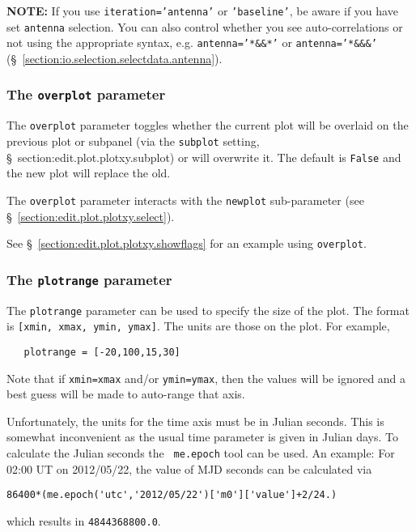 {\bf NOTE:} If you use {\tt iteration='antenna'} or {\tt 'baseline'},
be aware if you have set {\tt antenna} selection.  You can also
control whether you see auto-correlations or not using the appropriate
syntax, e.g. {\tt antenna='*\&\&*'} or {\tt antenna='*\&\&\&'}
(\S~\ref{section:io.selection.selectdata.antenna}).

\subsubsection{ The {\tt overplot} parameter}
\label{section:edit.plot.plotxy.overplot}

The {\tt overplot} parameter toggles whether the current plot will
be overlaid on the previous plot or subpanel (via the {\tt subplot}
setting, \S~{section:edit.plot.plotxy.subplot}) or will overwrite it.
The default is {\tt False} and the new plot will replace the old.

The {\tt overplot} parameter interacts with the {\tt newplot}
sub-parameter (see \S~\ref{section:edit.plot.plotxy.select}).

See \S~\ref{section:edit.plot.plotxy.showflags} for an example using 
{\tt overplot}. 

\subsubsection{ The {\tt plotrange} parameter}
\label{section:edit.plot.plotxy.plotrange}

The {\tt plotrange} parameter can be used to specify the size of the
plot.  The format is {\tt [xmin, xmax, ymin, ymax]}.  The units are
those on the plot.  For example,
\small
\begin{verbatim}
   plotrange = [-20,100,15,30]
\end{verbatim}
\normalsize
Note that if {\tt xmin=xmax} and/or {\tt ymin=ymax}, then the values
will be ignored and a best guess will be made to auto-range that axis.



Unfortunately, the units for the time axis must be in Julian
seconds. This is somewhat inconvenient as the usual time parameter is
given in Julian days. To calculate the Julian seconds the {\tt
  me.epoch} tool can be used. An example:
For 02:00 UT on 2012/05/22, the value of MJD seconds can be calculated
via 

\small
\begin{verbatim}
86400*(me.epoch('utc','2012/05/22')['m0']['value']+2/24.) 
\end{verbatim}
which results in {\tt 4844368800.0}.

